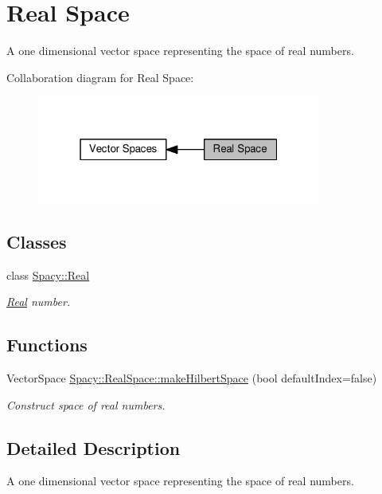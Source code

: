 \hypertarget{group__RealGroup}{}\section{Real Space}
\label{group__RealGroup}


A one dimensional vector space representing the space of real numbers.  


Collaboration diagram for Real Space\+:\nopagebreak
\begin{figure}[H]
\begin{center}
\leavevmode
\includegraphics[width=265pt]{group__RealGroup}
\end{center}
\end{figure}
\subsection*{Classes}
\begin{DoxyCompactItemize}
\item 
class \hyperlink{classSpacy_1_1Real}{Spacy\+::\+Real}
\begin{DoxyCompactList}\small\item\em \hyperlink{classSpacy_1_1Real}{Real} number. \end{DoxyCompactList}\end{DoxyCompactItemize}
\subsection*{Functions}
\begin{DoxyCompactItemize}
\item 
Vector\+Space \hyperlink{group__RealGroup_gaa07f743f9874ecff062c511b7126f8b6_gaa07f743f9874ecff062c511b7126f8b6}{Spacy\+::\+Real\+Space\+::make\+Hilbert\+Space} (bool default\+Index=false)
\begin{DoxyCompactList}\small\item\em Construct space of real numbers. \end{DoxyCompactList}\end{DoxyCompactItemize}


\subsection{Detailed Description}
A one dimensional vector space representing the space of real numbers. 



